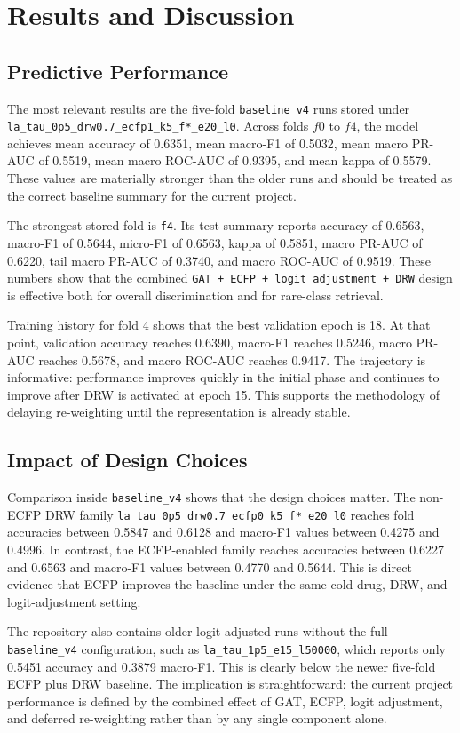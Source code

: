 \documentclass[12pt,a4paper]{report}
\begin{document}
\chapter{Results and Discussion}
\section*{Predictive Performance}
The most relevant results are the five-fold \texttt{baseline\_v4} runs stored under \texttt{la\_tau\_0p5\_drw0.7\_ecfp1\_k5\_f*\_e20\_l0}. Across folds \(f0\) to \(f4\), the model achieves mean accuracy of 0.6351, mean macro-F1 of 0.5032, mean macro PR-AUC of 0.5519, mean macro ROC-AUC of 0.9395, and mean kappa of 0.5579. These values are materially stronger than the older runs and should be treated as the correct baseline summary for the current project.

The strongest stored fold is \texttt{f4}. Its test summary reports accuracy of 0.6563, macro-F1 of 0.5644, micro-F1 of 0.6563, kappa of 0.5851, macro PR-AUC of 0.6220, tail macro PR-AUC of 0.3740, and macro ROC-AUC of 0.9519. These numbers show that the combined \texttt{GAT + ECFP + logit adjustment + DRW} design is effective both for overall discrimination and for rare-class retrieval.

Training history for fold 4 shows that the best validation epoch is 18. At that point, validation accuracy reaches 0.6390, macro-F1 reaches 0.5246, macro PR-AUC reaches 0.5678, and macro ROC-AUC reaches 0.9417. The trajectory is informative: performance improves quickly in the initial phase and continues to improve after DRW is activated at epoch 15. This supports the methodology of delaying re-weighting until the representation is already stable.

\section*{Impact of Design Choices}
Comparison inside \texttt{baseline\_v4} shows that the design choices matter. The non-ECFP DRW family \texttt{la\_tau\_0p5\_drw0.7\_ecfp0\_k5\_f*\_e20\_l0} reaches fold accuracies between 0.5847 and 0.6128 and macro-F1 values between 0.4275 and 0.4996. In contrast, the ECFP-enabled family reaches accuracies between 0.6227 and 0.6563 and macro-F1 values between 0.4770 and 0.5644. This is direct evidence that ECFP improves the baseline under the same cold-drug, DRW, and logit-adjustment setting.

The repository also contains older logit-adjusted runs without the full \texttt{baseline\_v4} configuration, such as \texttt{la\_tau\_1p5\_e15\_l50000}, which reports only 0.5451 accuracy and 0.3879 macro-F1. This is clearly below the newer five-fold ECFP plus DRW baseline. The implication is straightforward: the current project performance is defined by the combined effect of GAT, ECFP, logit adjustment, and deferred re-weighting rather than by any single component alone.
\end{document}
